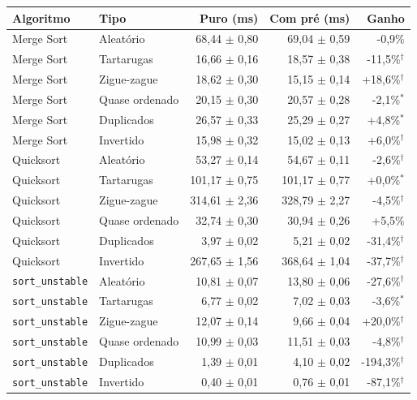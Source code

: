 \footnotesize
\begin{tabular}{llrrr}
\hline
\textbf{Algoritmo} & \textbf{Tipo} & \textbf{Puro (ms)} & \textbf{Com pré (ms)} & \textbf{Ganho} \\
\hline
Merge Sort & Aleatório & 68{,}44 $\pm$ 0{,}80 & 69{,}04 $\pm$ 0{,}59 & -0{,}9\% \\
Merge Sort & Tartarugas & 16{,}66 $\pm$ 0{,}16 & 18{,}57 $\pm$ 0{,}38 & -11{,}5\%$^{\dagger}$ \\
Merge Sort & Zigue-zague & 18{,}62 $\pm$ 0{,}30 & 15{,}15 $\pm$ 0{,}14 & +18{,}6\%$^{\dagger}$ \\
Merge Sort & Quase ordenado & 20{,}15 $\pm$ 0{,}30 & 20{,}57 $\pm$ 0{,}28 & -2{,}1\%$^{*}$ \\
Merge Sort & Duplicados & 26{,}57 $\pm$ 0{,}33 & 25{,}29 $\pm$ 0{,}27 & +4{,}8\%$^{*}$ \\
Merge Sort & Invertido & 15{,}98 $\pm$ 0{,}32 & 15{,}02 $\pm$ 0{,}13 & +6{,}0\%$^{\dagger}$ \\
Quicksort & Aleatório & 53{,}27 $\pm$ 0{,}14 & 54{,}67 $\pm$ 0{,}11 & -2{,}6\%$^{\dagger}$ \\
Quicksort & Tartarugas & 101{,}17 $\pm$ 0{,}75 & 101{,}17 $\pm$ 0{,}77 & +0{,}0\%$^{*}$ \\
Quicksort & Zigue-zague & 314{,}61 $\pm$ 2{,}36 & 328{,}79 $\pm$ 2{,}27 & -4{,}5\%$^{\dagger}$ \\
Quicksort & Quase ordenado & 32{,}74 $\pm$ 0{,}30 & 30{,}94 $\pm$ 0{,}26 & +5{,}5\% \\
Quicksort & Duplicados & 3{,}97 $\pm$ 0{,}02 & 5{,}21 $\pm$ 0{,}02 & -31{,}4\%$^{\dagger}$ \\
Quicksort & Invertido & 267{,}65 $\pm$ 1{,}56 & 368{,}64 $\pm$ 1{,}04 & -37{,}7\%$^{\dagger}$ \\
\texttt{sort\_unstable} & Aleatório & 10{,}81 $\pm$ 0{,}07 & 13{,}80 $\pm$ 0{,}06 & -27{,}6\%$^{\dagger}$ \\
\texttt{sort\_unstable} & Tartarugas & 6{,}77 $\pm$ 0{,}02 & 7{,}02 $\pm$ 0{,}03 & -3{,}6\%$^{*}$ \\
\texttt{sort\_unstable} & Zigue-zague & 12{,}07 $\pm$ 0{,}14 & 9{,}66 $\pm$ 0{,}04 & +20{,}0\%$^{\dagger}$ \\
\texttt{sort\_unstable} & Quase ordenado & 10{,}99 $\pm$ 0{,}03 & 11{,}51 $\pm$ 0{,}03 & -4{,}8\%$^{\dagger}$ \\
\texttt{sort\_unstable} & Duplicados & 1{,}39 $\pm$ 0{,}01 & 4{,}10 $\pm$ 0{,}02 & -194{,}3\%$^{\dagger}$ \\
\texttt{sort\_unstable} & Invertido & 0{,}40 $\pm$ 0{,}01 & 0{,}76 $\pm$ 0{,}01 & -87{,}1\%$^{\dagger}$ \\

\end{tabular}
